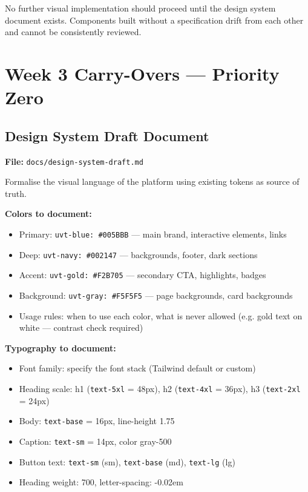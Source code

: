 \documentclass[12pt,a4paper]{article}
\begin{document}
\begin{darkbox}
No further visual implementation should proceed until the design system document exists.
Components built without a specification drift from each other and cannot be consistently
reviewed.
\end{darkbox}

\section{Week 3 Carry-Overs --- Priority Zero}

\subsection{Design System Draft Document}

\textbf{File:} \texttt{docs/design-system-draft.md}

Formalise the visual language of the platform using existing tokens as source of truth.

\vspace{0.8em}
\noindent\textbf{Colors to document:}

\begin{itemize}
    \item Primary: \texttt{uvt-blue: \#005BBB} --- main brand, interactive elements, links
    \item Deep: \texttt{uvt-navy: \#002147} --- backgrounds, footer, dark sections
    \item Accent: \texttt{uvt-gold: \#F2B705} --- secondary CTA, highlights, badges
    \item Background: \texttt{uvt-gray: \#F5F5F5} --- page backgrounds, card backgrounds
    \item Usage rules: when to use each color, what is never allowed (e.g. gold text on white --- contrast check required)
\end{itemize}

\vspace{0.8em}
\noindent\textbf{Typography to document:}

\begin{itemize}
    \item Font family: specify the font stack (Tailwind default or custom)
    \item Heading scale: h1 (\texttt{text-5xl} = 48px), h2 (\texttt{text-4xl} = 36px), h3 (\texttt{text-2xl} = 24px)
    \item Body: \texttt{text-base} = 16px, line-height 1.75
    \item Caption: \texttt{text-sm} = 14px, color gray-500
    \item Button text: \texttt{text-sm} (sm), \texttt{text-base} (md), \texttt{text-lg} (lg)
    \item Heading weight: 700, letter-spacing: -0.02em
\end{itemize}
\end{document}
